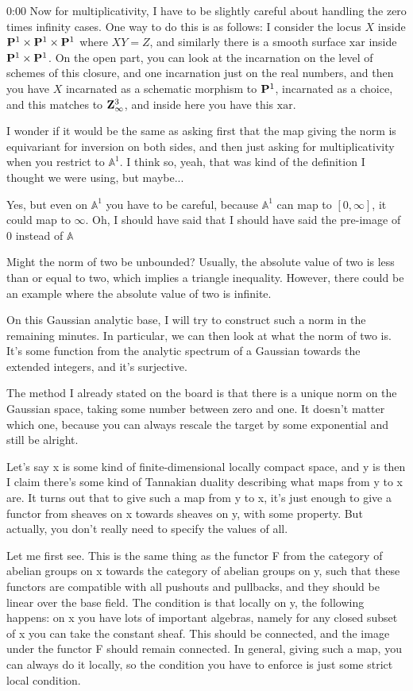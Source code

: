 \begin{unfinished}{0:00}
Now for multiplicativity, I have to be slightly careful about handling the zero times infinity cases. One way to do this is as follows: I consider the locus $X$ inside $\P^1 \times \P^1 \times \P^1$ where $XY = Z$, and similarly there is a smooth surface $\mathrm{xar}$ inside $\P^1 \times \P^1$. On the open part, you can look at the incarnation on the level of schemes of this closure, and one incarnation just on the real numbers, and then you have $X$ incarnated as a schematic morphism to $\P^1$, incarnated as a choice, and this matches to $\Z_{\infty}^3$, and inside here you have this $\mathrm{xar}$.

I wonder if it would be the same as asking first that the map giving the norm is equivariant for inversion on both sides, and then just asking for multiplicativity when you restrict to $\mathbb{A}^1$. I think so, yeah, that was kind of the definition I thought we were using, but maybe...

Yes, but even on $\mathbb{A}^1$ you have to be careful, because $\mathbb{A}^1$ can map to $[0, \infty]$, it could map to $\infty$. Oh, I should have said that I should have said the pre-image of $0$ instead of $\mathbb{A}$

Might the norm of two be unbounded? Usually, the absolute value of two is less than or equal to two, which implies a triangle inequality. However, there could be an example where the absolute value of two is infinite. 

On this Gaussian analytic base, I will try to construct such a norm in the remaining minutes. In particular, we can then look at what the norm of two is. It's some function from the analytic spectrum of a Gaussian towards the extended integers, and it's surjective. 

The method I already stated on the board is that there is a unique norm on the Gaussian space, taking some number between zero and one. It doesn't matter which one, because you can always rescale the target by some exponential and still be alright.

Let's say x is some kind of finite-dimensional locally compact space, and y is then I claim there's some kind of Tannakian duality describing what maps from y to x are. It turns out that to give such a map from y to x, it's just enough to give a functor from sheaves on x towards sheaves on y, with some property. But actually, you don't really need to specify the values of all.

Let me first see. This is the same thing as the functor F from the category of abelian groups on x towards the category of abelian groups on y, such that these functors are compatible with all pushouts and pullbacks, and they should be linear over the base field. The condition is that locally on y, the following happens: on x you have lots of important algebras, namely for any closed subset of x you can take the constant sheaf. This should be connected, and the image under the functor F should remain connected. In general, giving such a map, you can always do it locally, so the condition you have to enforce is just some strict local condition.


\end{unfinished}

